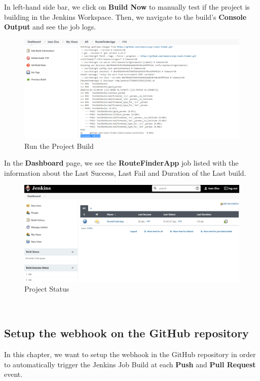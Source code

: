 \documentclass[12pt,a4paper,twoside]{article}
\begin{document}
In left-hand side bar, we click on \textbf{Build Now} to manually test if the project is building in the Jenkins Workspace. Then, we navigate to the build's \textbf{Console Output} and see the job logs.


\begin{figure}[H]
    \centering
        \includegraphics[width=15cm]{images-aws/38-test-build.png}
        \caption{Run the Project Build}
\end{figure}


In the \textbf{Dashboard} page, we see the \textbf{RouteFinderApp} job listed with the information about the Last Success, Last Fail and Duration of the Last build.


\begin{figure}[H]
    \centering
        \includegraphics[width=15cm]{images-aws/39-test-build-success.png}
        \caption{Project Status}
\end{figure}



~\newpage


\subsection{Setup the webhook on the GitHub repository}


In this chapter, we want to setup the webhook in the GitHub repository in order to automatically trigger the Jenkins Job Build at each \textbf{Push} and \textbf{Pull Request} event. 
\end{document}
